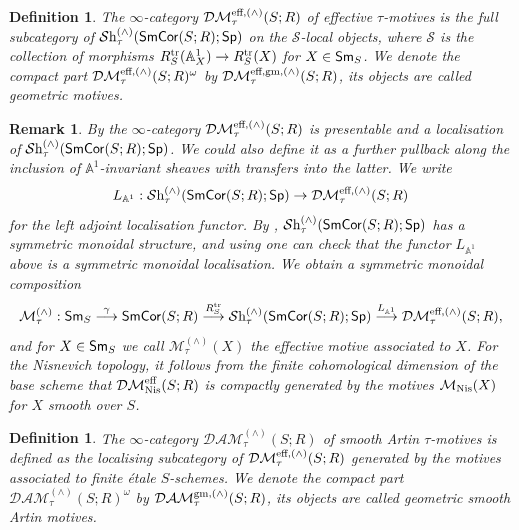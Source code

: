 \documentclass[reqno]{amsart}
\numberwithin{equation}{section}\theoremstyle{thms}
\theoremstyle{defn}
\newtheorem{defi}[equation]{Definition}
\newtheorem{rem}[equation]{Remark}
\newcommand{\bA}{\mathbb{A}}
\newcommand{\cM}{\mathcal{M}}
\newcommand{\cS}{\mathcal{S}}
\newcommand{\tn}[1]{\textnormal{#1}}
\newcommand{\tsf}[1]{\textsf{\textup{#1}}}
\newcommand{\mcal}[1]{\mathcal{#1}}
\newcommand{\sheaves}{\mcal{S}\tn{h}}
\newcommand{\spec}{\tsf{Sp}}
\newcommand{\sms}{\tsf{Sm}_S}
\newcommand{\corsms}[1]{\tsf{SmCor}(S;#1)}
\begin{document}
\begin{defi}\label{defi:motives}
The $\infty$-category $\mcal{DM}^{\tn{eff},(\wedge)}_{\tau}(S;R)$ of \emph{effective $\tau$-motives} is the full subcategory of $\sheaves_{\tau}^{(\wedge)}(\corsms{R};\spec)$ on the $\cS$-local objects, where $\cS$ is the collection of morphisms $R^\tn{tr}_S(\bA^1_X) \to R^\tn{tr}_S(X)$ for $X \in \tsf{Sm}_{S}$. We denote the compact part $\mcal{DM}^{\tn{eff},(\wedge)}_{\tau}(S;R)^{\omega}$ by $\mcal{DM}^{\tn{eff,gm}, (\wedge)}_{\tau}(S;R)$, its objects are called \emph{geometric} motives.
\end{defi}

\begin{rem}
By \cite[Proposition 5.5.4.15]{lur09} the $\infty$-category $\mcal{DM}^{\tn{eff},(\wedge)}_{\tau}(S;R)$ is presentable and a localisation of $\sheaves_{\tau}^{(\wedge)}(\corsms{R};\spec)$. We could also define it as a further pullback along the inclusion of $\bA^1$-invariant sheaves with transfers into the latter. We write 
$$L_{\bA^1}: \sheaves_{\tau}^{(\wedge)}(\corsms{R};\spec) \to \mcal{DM}^{\tn{eff},(\wedge)}_{\tau}(S;R)$$
for the left adjoint localisation functor. By , $\sheaves_{\tau}^{(\wedge)}(\corsms{R};\spec)$ has a symmetric monoidal structure, and using \cite[Proposition 2.2.1.9]{lur17} one can check that the functor $L_{\bA^1}$ above is a symmetric monoidal localisation. We obtain a symmetric monoidal composition
$$\cM_{\tau}^{(\wedge)}: \sms \stackrel{\gamma}{\longrightarrow} \corsms{R} \stackrel{R^{\tn{tr}}_S}{\longrightarrow} \sheaves_{\tau}^{(\wedge)}(\corsms{R};\spec) \stackrel{L_{\bA^1}}{\longrightarrow} \mcal{DM}^{\tn{eff},(\wedge)}_{\tau}(S;R),$$
and for $X \in \sms$ we call $\cM_{\tau}^{(\wedge)}(X)$ the \emph{effective motive associated to $X$}. For the Nisnevich topology, it follows from the finite cohomological dimension of the base scheme \cite[{}1.2.5]{ks86} that $\mcal{DM}_{\tn{Nis}}^{\tn{eff}}(S;R)$ is compactly generated by the motives $\cM_{\tn{Nis}}(X)$ for $X$ smooth over $S$.
\end{rem}

\begin{defi}\label{defi:smoothartinmotives}
The $\infty$-category $\mcal{DAM}_{\tau}^{(\wedge)}(S;R)$ of \emph{smooth Artin $\tau$-motives} is defined as the localising subcategory of $\mcal{DM}^{\tn{eff},(\wedge)}_{\tau}(S;R)$ generated by the motives associated to finite étale $S$-schemes. We denote the compact part $\mcal{DAM}_{\tau}^{(\wedge)}(S;R)^{\omega}$ by $\mcal{DAM}^{\tn{gm}, (\wedge)}_{\tau}(S;R)$, its objects are called \emph{geometric smooth Artin motives}. 
\end{defi}
\end{document}
